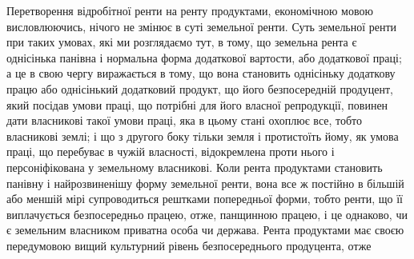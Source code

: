 Перетворення відробітної ренти на ренту продуктами, економічною мовою
висловлюючись, нічого не змінює в суті земельної ренти. Суть земельної ренти при
таких умовах, які ми розглядаємо тут, в тому, що земельна рента є однісінька
панівна і нормальна форма додаткової вартости, або додаткової праці; а це в
свою чергу виражається в тому, що вона становить однісіньку додаткову працю
або однісінький додатковий продукт, що його безпосередній продуцент, який
посідав умови праці, що потрібні для його власної репродукції, повинен
дати власникові такої умови праці, яка в цьому стані охоплює все, тобто
власникові землі; і що з другого боку тільки земля і протистоїть йому, як
умова праці, що перебуває в чужій власності, відокремлена проти нього і
персоніфікована у земельному власникові. Коли рента продуктами становить
панівну і найрозвиненішу форму земельної ренти, вона все ж постійно в більшій
або меншій мірі супроводиться рештками попередньої форми, тобто ренти, що
її виплачується безпосередньо працею, отже, панщинною працею, і це однаково,
чи є земельним власником приватна особа чи держава. Рента продуктами має
своєю передумовою вищий культурний рівень безпосереднього продуцента, отже
